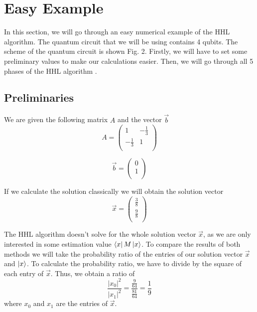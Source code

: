 \section{Easy Example}

In this section, we will go through an easy numerical example of the HHL algorithm.
The quantum circuit that we will be using contains 4 qubits.
The scheme of the quantum circuit is shown Fig. 2.
Firstly, we will have to set some preliminary values to make our calculations easier. 
Then, we will go through all 5 phases of the HHL algorithm \cite{qiskit_hhl}. 

\subsection{Preliminaries}
We are given the following matrix $A$ and the vector $\vec{b}$ 
\begin{equation}
   A = \begin{pmatrix} 1 & -\frac{1}{3}\\ -\frac{1}{3} & 1\\ \end{pmatrix}
\end{equation}

\begin{equation}
    \vec{b} = \begin{pmatrix} 0 \\ 1\\ \end{pmatrix}
\end{equation}

If we calculate the solution classically we will obtain the solution vector 
\begin{equation}
\vec{x} = \begin{pmatrix} \frac{3}{8}\\ \frac{9}{8}\\ \end{pmatrix}
\end{equation}

The HHL algorithm doesn't solve for the whole solution vector $\vec{x}$, as we are only interested in some estimation value $\bra x M \ket x$.
To compare the results of both methods we will take the probability ratio of the entries of our solution vector $\vec x$ and $\ket x$.
To calculate the probability ratio, we have to divide by the square of each entry of $\vec{x}$.
Thus, we obtain a ratio of
\begin{equation}
    \frac{ |x_0|^2}{ |x_1|^2}= \frac{\frac{9}{64}}{\frac{81}{64}} = \frac{1}{9}
\end{equation}
where $x_0$ and $x_1$ are the entries of $\vec x$.

